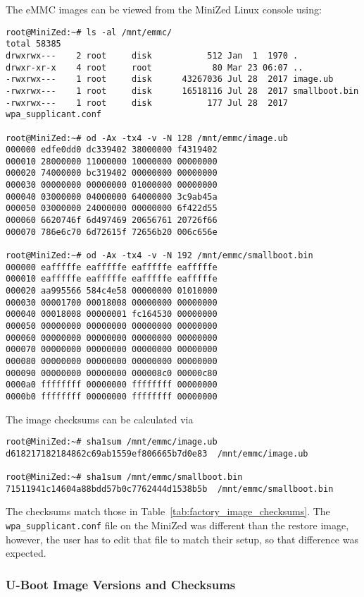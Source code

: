 The eMMC images can be viewed from the MiniZed Linux console using:
%
\begin{verbatim}
root@MiniZed:~# ls -al /mnt/emmc/
total 58385
drwxrwx---    2 root     disk           512 Jan  1  1970 .
drwxr-xr-x    4 root     root            80 Mar 23 06:07 ..
-rwxrwx---    1 root     disk      43267036 Jul 28  2017 image.ub
-rwxrwx---    1 root     disk      16518116 Jul 28  2017 smallboot.bin
-rwxrwx---    1 root     disk           177 Jul 28  2017 wpa_supplicant.conf

root@MiniZed:~# od -Ax -tx4 -v -N 128 /mnt/emmc/image.ub
000000 edfe0dd0 dc339402 38000000 f4319402
000010 28000000 11000000 10000000 00000000
000020 74000000 bc319402 00000000 00000000
000030 00000000 00000000 01000000 00000000
000040 03000000 04000000 64000000 3c9ab45a
000050 03000000 24000000 00000000 6f422d55
000060 6620746f 6d497469 20656761 20726f66
000070 786e6c70 6d72615f 72656b20 006c656e

root@MiniZed:~# od -Ax -tx4 -v -N 192 /mnt/emmc/smallboot.bin
000000 eafffffe eafffffe eafffffe eafffffe
000010 eafffffe eafffffe eafffffe eafffffe
000020 aa995566 584c4e58 00000000 01010000
000030 00001700 00018008 00000000 00000000
000040 00018008 00000001 fc164530 00000000
000050 00000000 00000000 00000000 00000000
000060 00000000 00000000 00000000 00000000
000070 00000000 00000000 00000000 00000000
000080 00000000 00000000 00000000 00000000
000090 00000000 00000000 000008c0 00000c80
0000a0 ffffffff 00000000 ffffffff 00000000
0000b0 ffffffff 00000000 ffffffff 00000000
\end{verbatim}
%
The image checksums can be calculated via
%
\begin{verbatim}
root@MiniZed:~# sha1sum /mnt/emmc/image.ub
d618217182184862c69ab1559ef806665b7d0e83  /mnt/emmc/image.ub

root@MiniZed:~# sha1sum /mnt/emmc/smallboot.bin
71511941c14604a88bdd57b0c7762444d1538b5b  /mnt/emmc/smallboot.bin
\end{verbatim}
%
The checksums match those in Table~\ref{tab:factory_image_checksums}.
The \verb+wpa_supplicant.conf+ file on the MiniZed was different than
the restore image, however, the user has to edit that file to match
their setup, so that difference was expected.

\clearpage
\subsubsection{U-Boot Image Versions and Checksums}
\label{sec:uboot_versions}


